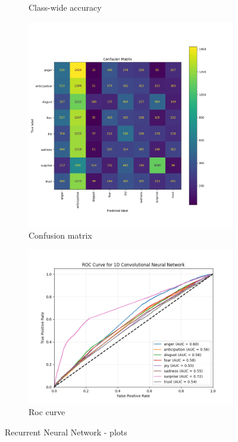\begin{figure}[H]
\begin{subfigure}{0.5\textwidth}
        \caption{Class-wide accuracy}
        \label{fig:rnn_classacc}
    \end{subfigure}
    \begin{subfigure}{0.53\textwidth}
        \includegraphics[width=\textwidth]{pictures/rnn_confusion_matrix.png}
        \caption{Confusion matrix}
        \label{fig:rnn_confmatr}
    \end{subfigure}
    \begin{subfigure}{0.45\textwidth}
        \includegraphics[width=\textwidth]{pictures/rnn_roc_curve.png}
        \caption{Roc curve}
        \label{fig:rnn_roccurve}
    \end{subfigure}
    \caption{Recurrent Neural Network - plots}
    \label{fig:rnn_performances}
\end{figure}

